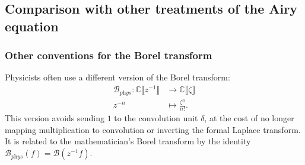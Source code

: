 \documentclass{article}
\newcommand{\maps}{\colon}
\newcommand{\C}{\mathbb{C}}
\newcommand{\series}[1]{\tilde{#1}}
\newcommand{\borel}{\mathcal{B}}
\theoremstyle{definition}
\theoremstyle{plain}
\begin{document}

%
\subsection{Comparison with other treatments of the Airy equation}\label{airy-comparison}
%
\subsubsection{Other conventions for the Borel transform}
%
Physicists often use a different version of the Borel transform:
\begin{align*}
\borel_{\textit{phys}} \maps \C \llbracket z^{-1} \rrbracket & \to \C \llbracket \zeta \rrbracket \\
z^{-n} & \mapsto \frac{\zeta^n}{n!}.
\end{align*}
This version avoids sending $1$ to the convolution unit $\delta$, at the cost of no longer mapping multiplication to convolution or inverting the formal Laplace transform. It is related to the mathematician's Borel transform by the identity $\borel_\textit{phys}(f) = \borel(z^{-1} f)$.
\end{document}
